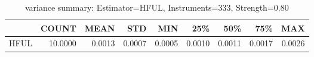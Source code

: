 \begin{table}[ht]
\centering
\caption{variance summary: Estimator=HFUL, Instruments=333, Strength=0.80}
\begin{tabular}{lrrrrrrrr}
\toprule
 & COUNT & MEAN & STD & MIN & 25\% & 50\% & 75\% & MAX \\
\midrule
HFUL & 10.0000 & 0.0013 & 0.0007 & 0.0005 & 0.0010 & 0.0011 & 0.0017 & 0.0026 \\
\bottomrule
\end{tabular}
\end{table}

